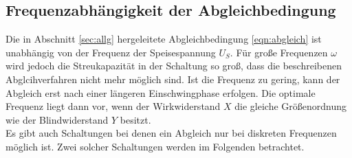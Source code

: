\subsection{Frequenzabhängigkeit der Abgleichbedingung}
\label{sec:frequenzabhängig}
Die in Abschnitt \ref{sec:allg} hergeleitete Abgleichbedingung \eqref{eqn:abgleich} ist unabhängig von der Frequenz der Speisespannung $U_S$.
Für große Frequenzen $\omega$ wird jedoch die Streukapazität in der Schaltung so groß, dass die beschreibenen Abglcihverfahren nicht mehr 
möglich sind. Ist die Frequenz zu gering, kann der Abgleich erst nach einer längeren Einschwingphase erfolgen. Die optimale Frequenz liegt 
dann vor, wenn der Wirkwiderstand $X$ die gleiche Größenordnung wie der Blindwiderstand $Y$ besitzt.
\\\noindent 
Es gibt auch Schaltungen bei denen ein Abgleich nur bei diskreten Frequenzen möglich ist. Zwei solcher Schaltungen werden im Folgenden
betrachtet.  

